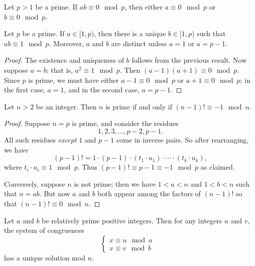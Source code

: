 \begin{cor}
Let \(p > 1\) be a prime.
If \(ab \equiv 0 \mod p\), then either \(a \equiv 0 \mod p\) or \(b \equiv 0 \mod p\).
\end{cor}

\begin{cor}
Let \(p\) be a prime.
If \(a \in [1,p)\), then there is a unique \(b \in [1,p)\) such that \(ab \equiv 1 \mod p\).
Moreover, \(a\) and \(b\) are distinct unless \(a = 1\) or \(a = p-1\).
\end{cor}

\begin{proof}
The existence and uniqueness of \(b\) follows from the previous result.
Now suppose \(a = b\); that is, \(a^2 \equiv 1 \mod p\).
Then \((a-1)(a+1) \equiv 0 \mod p\).
Since \(p\) is prime, we must have either \(a-1 \equiv 0 \mod p\) or \(a+1 \equiv 0 \mod p\); in the first case, \(a = 1\), and in the second case, \(a = p-1\).
\end{proof}

\begin{cor}
Let \(n > 2\) be an integer.
Then \(n\) is prime if and only if \((n-1)! \equiv -1 \mod n\).
\end{cor}

\begin{proof}
Suppose \(n = p\) is prime, and consider the residues \[ 1, 2, 3, \ldots, p-2, p-1. \]
All such residues \emph{except} \(1\) and \(p-1\) come in inverse pairs.
So after rearranging, we have \[ (p-1)! = 1 \cdot (p-1) \cdot (t_1 \cdot u_1) \cdot \cdots \cdot (t_k \cdot u_k), \] where \(t_i \cdot u_i \equiv 1 \mod p\).
Thus \((p-1)! \equiv p-1 \equiv -1 \mod p\) as claimed.

Conversely, suppose \(n\) is not prime; then we have \(1 < a < n\) and \(1 < b < n\) such that \(n = ab\).
But now \(a\) and \(b\) both appear among the factors of \((n-1)!\) so that \((n-1)! \equiv 0 \mod n\).
\end{proof}

\begin{prop}
Let \(a\) and \(b\) be relatively prime positive integers.
Then for any integers \(u\) and \(v\), the system of congruences \[ \begin{cases} x \equiv u \mod a & \\ x \equiv v \mod b & \end{cases} \] has a unique solution mod \(n\).
\end{prop}

